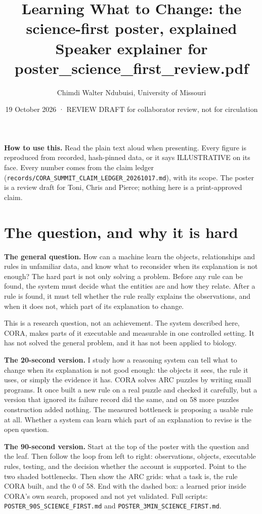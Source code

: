 \documentclass[11pt, a4paper]{article}
\author{Chimdi Walter Ndubuisi, University of Missouri}
\date{19 October 2026 · REVIEW DRAFT for collaborator review, not for circulation}
\title{Learning What to Change: the science-first poster, explained\\\medskip
\large Speaker explainer for poster\_science\_first\_review.pdf}
\begin{document}
\maketitle
\raggedright

\textbf{How to use this.} Read the plain text aloud when presenting. Every figure is reproduced from recorded, hash-pinned
data, or it says ILLUSTRATIVE on its face. Every number comes from the claim ledger
(\texttt{records/CORA\_SUMMIT\_CLAIM\_LEDGER\_20261017.md}), with its scope. The poster is a review draft for Toni, Chris and
Pierce; nothing here is a print-approved claim.

\section{The question, and why it is hard}
\label{sec-question}
\textbf{The general question.} How can a machine learn the objects, relationships and rules in unfamiliar data, and know what to
reconsider when its explanation is not enough? The hard part is not only solving a problem. Before any rule can be
found, the system must decide what the entities are and how they relate. After a rule is found, it must tell whether
the rule really explains the observations, and when it does not, which part of its explanation to change.

This is a research question, not an achievement. The system described here, CORA, makes parts of it executable and
measurable in one controlled setting. It has not solved the general problem, and it has not been applied to biology.

\textbf{The 20-second version.} I study how a reasoning system can tell what to change when its explanation is not good
enough: the objects it sees, the rule it uses, or simply the evidence it has. CORA solves ARC puzzles by writing small
programs. It once built a new rule on a real puzzle and checked it carefully, but a version that ignored its failure
record did the same, and on 58 more puzzles construction added nothing. The measured bottleneck is proposing a usable
rule at all. Whether a system can learn which part of an explanation to revise is the open question.

\textbf{The 90-second version.} Start at the top of the poster with the question and the leaf. Then follow the loop from left to
right: observations, objects, executable rules, testing, and the decision whether the account is supported. Point to the
two shaded bottlenecks. Then show the ARC grids: what a task is, the rule CORA built, and the 0 of 58. End with the
dashed box: a learned prior inside CORA's own search, proposed and not yet validated. Full scripts:
\texttt{POSTER\_90S\_SCIENCE\_FIRST.md} and \texttt{POSTER\_3MIN\_SCIENCE\_FIRST.md}.
\end{document}
